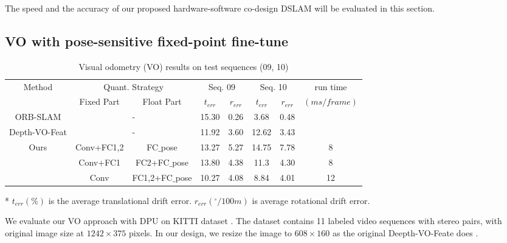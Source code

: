 \label{sec:experiment}
The speed and the accuracy of our proposed hardware-software co-design DSLAM will be evaluated in this section.

\subsection{VO with pose-sensitive fixed-point fine-tune}

\begin{table}[bht]
  \centering
  \caption{Visual odometry (VO) results on test sequences (09, 10)}
  \footnotesize
  \begin{threeparttable}
\begin{tabular}{|c||cc|cc|cc|c|}
\hline
\multirow{2}[2]{*}{Method} & \multicolumn{2}{c|}{Quant. Strategy} & \multicolumn{2}{c|}{Seq. 09} & \multicolumn{2}{c|}{Seq. 10} & run time  \bigstrut[t]\\
                           & Fixed Part             & Float Part  & $t_{err}$        & $r_{err}$ & $t_{err}$        & $r_{err}$ & $(ms/frame)$ \bigstrut[b]\\
\hline
ORB-SLAM  & \multicolumn{2}{c|}{-} &15.30 &0.26 &3.68 &0.48 &  \bigstrut\\
\hline
Depth-VO-Feat\cite{Zhan:2018e92} & \multicolumn{2}{c|}{-} &11.92 &3.60 &12.62 &3.43 &  \bigstrut\\
\hline
\multirow{3}[3]{*}{Ours} & Conv+FC1,2 & FC$\_$pose & 13.27 & 5.27 & 14.75 & 7.78 & 8 \bigstrut\\
                         & Conv+FC1 & FC2+FC$\_$pose  & 13.80 & 4.38 & 11.3 & 4.30 & 8 \bigstrut\\
                         & Conv & FC1,2+FC$\_$pose &10.27 &4.08 &8.84 &4.01 & 12 \bigstrut\\
\hline
\end{tabular}

\begin{tablenotes}
      \item[*] $t_{err}(\%)$ is the average translational drift error. $r_{err}({}^{\circ}/100m)$ is average rotational drift error.
      \end{tablenotes}
    \end{threeparttable}
  \label{tab:VO}%
\end{table}%


We evaluate our VO approach with DPU on KITTI dataset \cite{geiger2013vision}. The dataset contains 11 labeled video sequences with stereo pairs, with original image size at $1242 \times 375$ pixels. In our design, we resize the image to $608 \times 160$ as the original Deepth-VO-Feate does \cite{Zhan:2018e92}.

